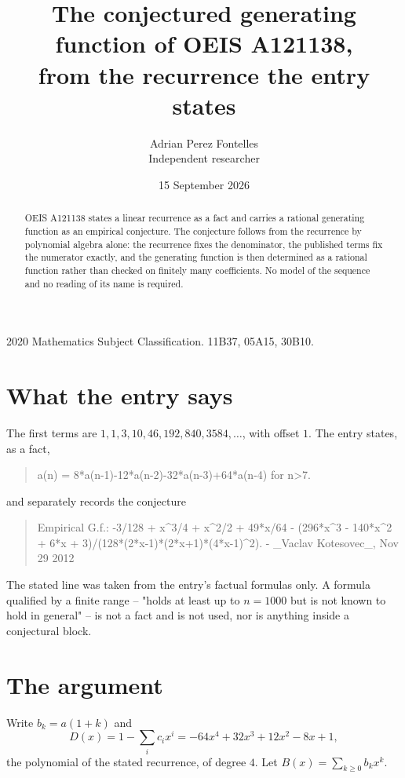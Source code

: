\documentclass[11pt,a4paper]{article}
\title{The conjectured generating function of OEIS A121138,\\ \large from the recurrence the entry
states}
\author{Adrian Perez Fontelles\\ \small Independent researcher}
\date{15 September 2026}
\theoremstyle{plain}
\theoremstyle{definition}
\begin{document}
\maketitle

\begin{abstract}
OEIS A121138 states a linear recurrence as a fact and carries a rational generating function as an
empirical conjecture. The conjecture follows from the recurrence by polynomial algebra alone:
the recurrence fixes the denominator, the published terms fix the numerator exactly, and the
generating function is then determined as a rational function rather than checked on finitely
many coefficients. No model of the sequence and no reading of its name is required.
\end{abstract}

\noindent\small 2020 Mathematics Subject Classification. 11B37, 05A15, 30B10.\normalsize

\section{What the entry says}

The first terms are $1, 1, 3, 10, 46, 192, 840, 3584,\dots$, with offset $1$. The entry states, as a fact,

\begin{quote}\raggedright a(n) = 8*a(n-1)-12*a(n-2)-32*a(n-3)+64*a(n-4) for n>7.\end{quote}

\noindent and separately records the conjecture

\begin{quote}\raggedright Empirical G.f.: -3/128 + x\^{}3/4 + x\^{}2/2 + 49*x/64 - (296*x\^{}3 - 140*x\^{}2 + 6*x + 3)/(128*(2*x-1)*(2*x+1)*(4*x-1)\^{}2). - \_Vaclav Kotesovec\_, Nov 29 2012\end{quote}

The stated line was taken from the entry's factual formulas only. A formula qualified by a
finite range -- "holds at least up to $n=1000$ but is not known to hold in general" -- is not a
fact and is not used, nor is anything inside a conjectural block.

\section{The argument}

Write $b_k=a(1+k)$ and
\[
  D(x)=1-\sum_{i} c_i x^{i}=- 64 x^{4} + 32 x^{3} + 12 x^{2} - 8 x + 1 ,
\]
the polynomial of the stated recurrence, of degree $4$. Let $B(x)=\sum_{k\ge0}b_kx^k$.
\end{document}
